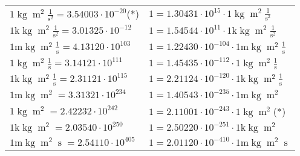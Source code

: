 \begin{center}
\begin{longtable}{l l}
{\color{black}$1 \bm{\mathrm{ }}\operatorname{kg}{\operatorname{m}^2}\frac1{\operatorname{s}^2}{}{} = 3.54003\cdot10^{-20} $}\quad(*) & {\color{black}$ 1 = 1.30431\cdot10^{15} \cdot 1 \bm{\mathrm{ }}\operatorname{kg}{\operatorname{m}^2}\frac1{\operatorname{s}^2}{}{}$}  \\
{\color{gray}$1 \bm{\mathrm{ k}}\operatorname{kg}{\operatorname{m}^2}\frac1{\operatorname{s}^2}{}{} = 3.01325\cdot10^{-12} $}   & {\color{gray}$ 1 = 1.54544\cdot10^{11} \cdot 1 \bm{\mathrm{ k}}\operatorname{kg}{\operatorname{m}^2}\frac1{\operatorname{s}^2}{}{}$}  \\
{\color{gray}$1 \bm{\mathrm{ m}}\operatorname{kg}{\operatorname{m}^2}\frac1{\operatorname{s}}{}{} = 4.13120\cdot10^{103} $}   & {\color{gray}$ 1 = 1.22430\cdot10^{-104} \cdot 1 \bm{\mathrm{ m}}\operatorname{kg}{\operatorname{m}^2}\frac1{\operatorname{s}}{}{}$}  \\
{\color{black}$1 \bm{\mathrm{ }}\operatorname{kg}{\operatorname{m}^2}\frac1{\operatorname{s}}{}{} = 3.14121\cdot10^{111} $}   & {\color{black}$ 1 = 1.45435\cdot10^{-112} \cdot 1 \bm{\mathrm{ }}\operatorname{kg}{\operatorname{m}^2}\frac1{\operatorname{s}}{}{}$}  \\
{\color{gray}$1 \bm{\mathrm{ k}}\operatorname{kg}{\operatorname{m}^2}\frac1{\operatorname{s}}{}{} = 2.31121\cdot10^{115} $}   & {\color{gray}$ 1 = 2.21124\cdot10^{-120} \cdot 1 \bm{\mathrm{ k}}\operatorname{kg}{\operatorname{m}^2}\frac1{\operatorname{s}}{}{}$}  \\
{\color{gray}$1 \bm{\mathrm{ m}}\operatorname{kg}{\operatorname{m}^2}{}{}{} = 3.31321\cdot10^{234} $}   & {\color{gray}$ 1 = 1.40543\cdot10^{-235} \cdot 1 \bm{\mathrm{ m}}\operatorname{kg}{\operatorname{m}^2}{}{}{}$}  \\
{\color{black}$1 \bm{\mathrm{ }}\operatorname{kg}{\operatorname{m}^2}{}{}{} = 2.42232\cdot10^{242} $}   & {\color{black}$ 1 = 2.11001\cdot10^{-243} \cdot 1 \bm{\mathrm{ }}\operatorname{kg}{\operatorname{m}^2}{}{}{}$}\quad(*)\\
{\color{gray}$1 \bm{\mathrm{ k}}\operatorname{kg}{\operatorname{m}^2}{}{}{} = 2.03540\cdot10^{250} $}   & {\color{gray}$ 1 = 2.50220\cdot10^{-251} \cdot 1 \bm{\mathrm{ k}}\operatorname{kg}{\operatorname{m}^2}{}{}{}$}  \\
{\color{gray}$1 \bm{\mathrm{ m}}\operatorname{kg}{\operatorname{m}^2}{\operatorname{s}}{}{} = 2.54110\cdot10^{405} $}   & {\color{gray}$ 1 = 2.01120\cdot10^{-410} \cdot 1 \bm{\mathrm{ m}}\operatorname{kg}{\operatorname{m}^2}{\operatorname{s}}{}{}$}  \\

\end{longtable}
\end{center}
